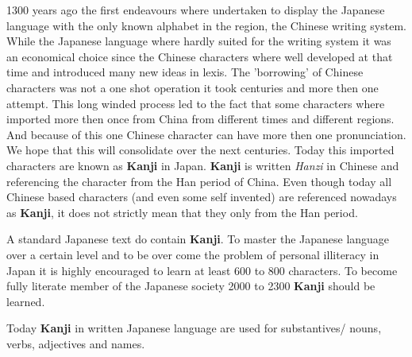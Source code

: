 1300 years ago the first endeavours where undertaken to display the Japanese
language with the only known alphabet in the region, the Chinese writing
system. While the Japanese language where hardly suited for the writing system
it was an  economical choice since the Chinese characters where well developed
at that time and introduced many new ideas in lexis. The 'borrowing' of Chinese
characters was not a one shot operation it took centuries and more then one
attempt. This long winded process led to the fact that some characters where
imported more then once from China from different times and different regions.
And because of this one Chinese character can have more then one pronunciation.
We hope that this will consolidate over the next centuries.  Today this
imported characters are known as \textbf{Kanji} in Japan.  \textbf{Kanji} is
written \textit{Hanzi} in Chinese and referencing the character from the Han
period of China. Even though today all Chinese based characters (and even some
self invented) are referenced nowadays as \textbf{Kanji}, it does not strictly
mean that they only from the Han period.

A standard Japanese text do contain \textbf{Kanji}. To master the Japanese
language over a certain level and to be over come the problem of personal
illiteracy in Japan it is highly encouraged to learn at least 600 to 800
characters. To become fully literate member of the Japanese society 2000 to
2300 \textbf{Kanji} should be learned.

Today  \textbf{Kanji} in written Japanese language are used for substantives/
nouns, verbs, adjectives and names.

